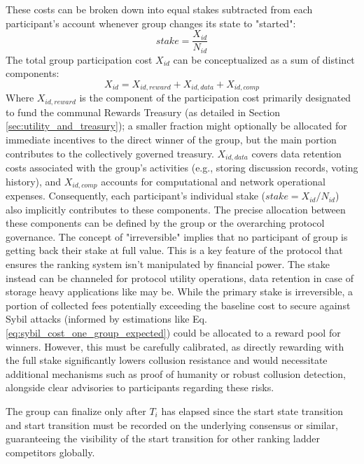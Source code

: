 \documentclass{article}
\begin{document}
\begin{CJK}{UTF8}{gbsn}
    These costs can be broken down into equal stakes subtracted from each participant's account whenever group changes its state to "started":
    \begin{equation}
        \label{eq:join-fee}
        stake = \dfrac{X_{id}}{ N_{id}}
    \end{equation}
    The total group participation cost $X_{id}$ can be conceptualized as a sum of distinct components:
    \begin{equation}
        X_{id} = X_{id,reward} + X_{id,data} + X_{id,comp}
    \end{equation}
    Where $X_{id,reward}$ is the component of the participation cost primarily designated to fund the communal Rewards Treasury (as detailed in Section \ref{sec:utility_and_treasury}); a smaller fraction might optionally be allocated for immediate incentives to the direct winner of the group, but the main portion contributes to the collectively governed treasury. $X_{id,data}$ covers data retention costs associated with the group's activities (e.g., storing discussion records, voting history), and $X_{id,comp}$ accounts for computational and network operational expenses. Consequently, each participant's individual stake ($stake = X_{id} / N_{id}$) also implicitly contributes to these components. The precise allocation between these components can be defined by the group or the overarching protocol governance.
    The concept of "irreversible" implies that no participant of group is getting back their stake at full value. This is a key feature of the protocol that ensures the ranking system isn't manipulated by financial power. The stake instead can be channeled for protocol utility operations, data retention in case of storage heavy applications like \cite{cvpp} may be. While the primary stake is irreversible, a portion of collected fees potentially exceeding the baseline cost to secure against Sybil attacks (informed by estimations like Eq. \ref{eq:sybil_cost_one_group_expected}) could be allocated to a reward pool for winners. However, this must be carefully calibrated, as directly rewarding with the full stake significantly lowers collusion resistance and would necessitate additional mechanisms such as proof of humanity \cite{WorldCoin2024} or robust collusion detection, alongside clear advisories to participants regarding these risks.



    The group can finalize only after $T_{i}$ has elapsed since the start state transition and start transition must be recorded on the underlying consensus or similar, guaranteeing the visibility of the start transition for other ranking ladder competitors globally.


\end{CJK}
\end{document}
